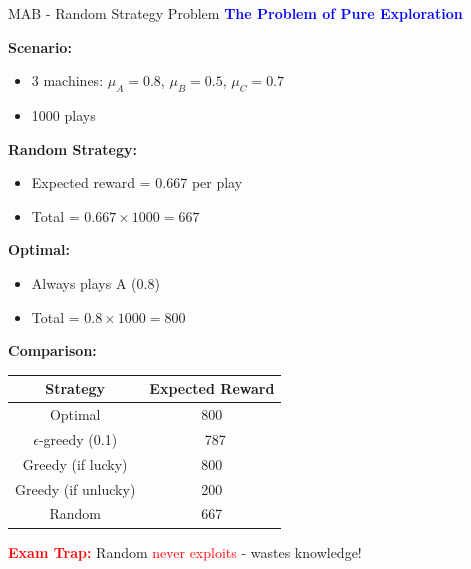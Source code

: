 \documentclass[8pt]{beamer}
\begin{document}
	\begin{frame}{MAB - Random Strategy Problem}
		\fontsize{6.5}{7.5}\selectfont
		\textcolor{blue}{\textbf{The Problem of Pure Exploration}}
		
		\textbf{Scenario:}
		\begin{itemize}
			\item 3 machines: $\mu_A = 0.8$, $\mu_B = 0.5$, $\mu_C = 0.7$
			\item 1000 plays
		\end{itemize}
		
		\textbf{Random Strategy:}
		\begin{itemize}
			\item Expected reward = 0.667 per play
			\item Total = $0.667 \times 1000 = 667$
		\end{itemize}
		
		\textbf{Optimal:}
		\begin{itemize}
			\item Always plays A (0.8)
			\item Total = $0.8 \times 1000 = 800$
		\end{itemize}
		
		\textbf{Comparison:}
		\begin{tabular}{|c|c|}
			\hline
			Strategy & Expected Reward \\
			\hline
			Optimal & 800 \\
			\hline
			$\epsilon$-greedy (0.1) & ~787 \\
			\hline
			Greedy (if lucky) & 800 \\
			\hline
			Greedy (if unlucky) & 200 \\
			\hline
			Random & 667 \\
			\hline
		\end{tabular}
		
		\textcolor{red}{\textbf{Exam Trap:}} Random \textcolor{red}{never exploits} - wastes knowledge!
	\end{frame}
	
\end{document}
